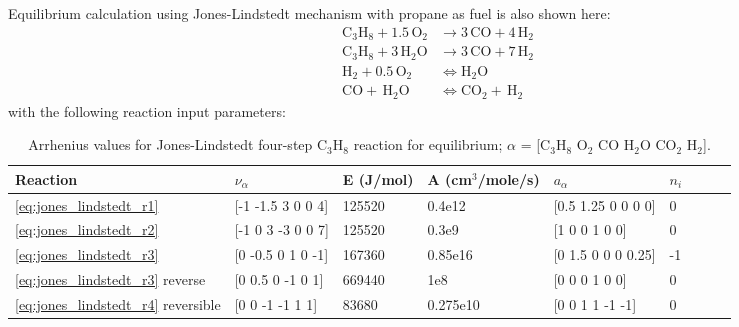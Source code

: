 \documentclass[11pt]{book}
\begin{document}
Equilibrium calculation using Jones-Lindstedt mechanism \cite{Jones_Lindstedt:1988} with propane as fuel is also shown here:
\begin{subequations}
\begin{align}
\label{eq:jones_lindstedt_r1}
\mathrm{C_3H_8+1.5 \, O_2} &\rightarrow \mathrm{3 \, CO+4 \, H_2} \\
\label{eq:jones_lindstedt_r2}
\mathrm{C_3H_8+3 \, H_2O} &\rightarrow \mathrm{3 \, CO+7 \, H_2} \\
\label{eq:jones_lindstedt_r3}
\mathrm{H_2+0.5 \, O_2} &\Leftrightarrow \mathrm{H_2O} \\
\label{eq:jones_lindstedt_r4}
\mathrm{CO+ \, H_2O} &\Leftrightarrow \mathrm{CO_2+ \, H_2}
\end{align}
\end{subequations}
with the following reaction input parameters: 
\begin{table}[ht]
\begin{center}
\caption[Arrhenius values for Jones-Lindstedt four-step reversible C$_3$H$_8$ reaction]{Arrhenius values for Jones-Lindstedt four-step C$_3$H$_8$ reaction for equilibrium; $\alpha$ = [$\mathrm{C_3H_8}$ $\mathrm{O_2}$ $\mathrm{CO}$ $\mathrm{H_2O}$  $\mathrm{CO_2}$ $\mathrm{H_2}$].}
\label{jones_lindstedt_four_step_eq_rev_c3h8}
\begin{tabular}{|l|l|l|l|l|l|l|l|l|}
\hline Reaction & $\nu_{\alpha}$ & E (J/mol) & A (cm$^3$/mole/s) & $a_{\alpha}$ & $n_i$  \\ \hline \hline
\ref{eq:jones_lindstedt_r1} & [-1 -1.5 3 0 0 4] & 125520 & 0.4e12 & [0.5 1.25 0 0 0 0] & 0 \\ \hline
\ref{eq:jones_lindstedt_r2} & [-1 0 3 -3 0 0 7] & 125520 & 0.3e9 & [1 0 0 1 0 0] & 0 \\ \hline
\ref{eq:jones_lindstedt_r3} & [0 -0.5 0 1 0 -1]  & 167360 & 0.85e16    & [0 1.5 0 0 0 0.25]    & -1 \\ \hline
\ref{eq:jones_lindstedt_r3} reverse & [0 0.5 0 -1 0 1]  & 669440 & 1e8    & [0 0 0 1 0 0]    & 0 \\ \hline
\ref{eq:jones_lindstedt_r4} reversible& [0 0 -1 -1 1 1]  & 83680 & 0.275e10    & [0 0 1 1 -1 -1]    & 0  \\ \hline
\end{tabular}
\end{center}
\end{table}
\end{document}
